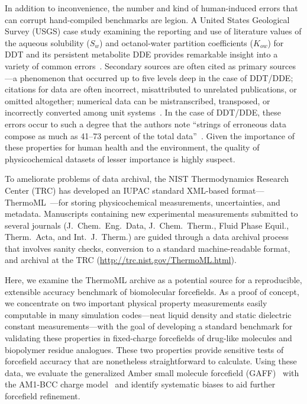 \documentclass[aip, jcp, reprint]{revtex4-1}  %
\begin{document}
In addition to inconvenience, the number and kind of human-induced errors that can corrupt hand-compiled benchmarks are legion.
A United States Geological Survey (USGS) case study examining the reporting and use of literature values of the aqueous solubility ($S_w$) and octanol-water partition coefficients ($K_{ow}$) for DDT and its persistent metabolite DDE provides remarkable insight into a variety of common errors~\cite{usgs-ddt-report}.
Secondary sources are often cited as primary sources---a phenomenon that occurred up to five levels deep in the case of DDT/DDE;
citations for data are often incorrect, misattributed to unrelated publications, or omitted altogether;
numerical data can be mistranscribed, transposed, or incorrectly converted among unit systems~\cite{usgs-ddt-report}.
In the case of DDT/DDE, these errors occur to such a degree that the authors note ``strings of erroneous data compose as much as 41--73 percent of the total data''~\cite{usgs-ddt-report}.
Given the importance of these properties for human health and the environment, the quality of physicochemical datasets of lesser importance is highly suspect.

To ameliorate problems of data archival, the NIST Thermodynamics Research Center (TRC) has developed an IUPAC standard XML-based format---ThermoML~\cite{frenkel2003thermoml, frenkel2006xml, chirico2013improvement}---for storing physicochemical measurements, uncertainties, and metadata.
Manuscripts containing new experimental measurements submitted to several journals (J.~Chem.~Eng.~Data, J.~Chem.~Therm., Fluid Phase Equil., Therm.~Acta, and Int.~J.~Therm.) are guided through a data archival process that involves sanity checks, conversion to a standard machine-readable format, and archival at the TRC (\url{http://trc.nist.gov/ThermoML.html}).  

Here, we examine the ThermoML archive as a potential source for a reproducible, extensible accuracy benchmark of biomolecular forcefields.
As a proof of concept, we concentrate on two important physical property measurements easily computable in many simulation codes---neat liquid density and static dielectric constant measurements---with the goal of developing a standard benchmark for validating these properties in fixed-charge forcefields of drug-like molecules and biopolymer residue analogues.  
These two properties provide sensitive tests of forcefield accuracy that are nonetheless straightforward to calculate.  
Using these data, we evaluate the generalized Amber small molecule forcefield (GAFF)~\cite{gaff,gaff2} with the AM1-BCC charge model~\cite{am1bcc1,am1bcc2} and identify systematic biases to aid further forcefield refinement.
\end{document}
